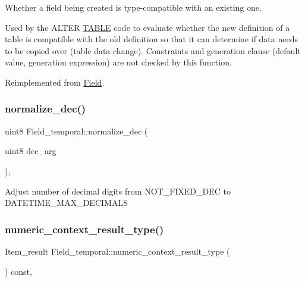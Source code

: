 Whether a field being created is type-\/compatible with an existing one.

Used by the A\+L\+T\+ER \mbox{\hyperlink{structTABLE}{T\+A\+B\+LE}} code to evaluate whether the new definition of a table is compatible with the old definition so that it can determine if data needs to be copied over (table data change). Constraints and generation clause (default value, generation expression) are not checked by this function. 

Reimplemented from \mbox{\hyperlink{classField_a8c99e9c66c1d578a339ae87d128843b7}{Field}}.

\mbox{\label{classField__temporal_a59092c5657c6b4dee5043fe3b6009705}} 
\subsubsection{\texorpdfstring{normalize\+\_\+dec()}{normalize\_dec()}}
{\footnotesize\ttfamily uint8 Field\+\_\+temporal\+::normalize\+\_\+dec (\begin{DoxyParamCaption}\item[{uint8}]{dec\+\_\+arg }\end{DoxyParamCaption})\hspace{0.3cm}{\ttfamily [inline]}, {\ttfamily [protected]}}

Adjust number of decimal digits from N\+O\+T\+\_\+\+F\+I\+X\+E\+D\+\_\+\+D\+EC to D\+A\+T\+E\+T\+I\+M\+E\+\_\+\+M\+A\+X\+\_\+\+D\+E\+C\+I\+M\+A\+LS \mbox{\label{classField__temporal_aa513969b17439a95085975d1ecebe670}} 
\subsubsection{\texorpdfstring{numeric\+\_\+context\+\_\+result\+\_\+type()}{numeric\_context\_result\_type()}}
{\footnotesize\ttfamily Item\+\_\+result Field\+\_\+temporal\+::numeric\+\_\+context\+\_\+result\+\_\+type (\begin{DoxyParamCaption}{ }\end{DoxyParamCaption}) const\hspace{0.3cm}{\ttfamily [inline]}, {\ttfamily [virtual]}}

